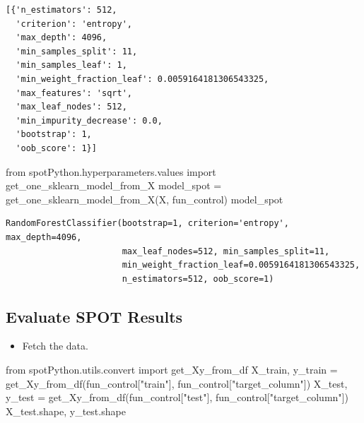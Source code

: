 \documentclass[
  letterpaper,
  DIV=11,
  numbers=noendperiod]{scrreprt}
\newenvironment{Shaded}{\begin{snugshade}}{\end{snugshade}}
\newcommand{\ImportTok}[1]{\textcolor[rgb]{0.00,0.46,0.62}{#1}}
\newcommand{\NormalTok}[1]{\textcolor[rgb]{0.00,0.23,0.31}{#1}}
\newcommand{\OperatorTok}[1]{\textcolor[rgb]{0.37,0.37,0.37}{#1}}
\newcommand{\StringTok}[1]{\textcolor[rgb]{0.13,0.47,0.30}{#1}}
\providecommand{\tightlist}{%
  \setlength{\itemsep}{0pt}\setlength{\parskip}{0pt}}\usepackage{longtable,booktabs,array}
\begin{document}
\begin{verbatim}
[{'n_estimators': 512,
  'criterion': 'entropy',
  'max_depth': 4096,
  'min_samples_split': 11,
  'min_samples_leaf': 1,
  'min_weight_fraction_leaf': 0.0059164181306543325,
  'max_features': 'sqrt',
  'max_leaf_nodes': 512,
  'min_impurity_decrease': 0.0,
  'bootstrap': 1,
  'oob_score': 1}]
\end{verbatim}

\begin{Shaded}
\begin{Highlighting}[]
\ImportTok{from}\NormalTok{ spotPython.hyperparameters.values }\ImportTok{import}\NormalTok{ get\_one\_sklearn\_model\_from\_X}
\NormalTok{model\_spot }\OperatorTok{=}\NormalTok{ get\_one\_sklearn\_model\_from\_X(X, fun\_control)}
\NormalTok{model\_spot}
\end{Highlighting}
\end{Shaded}

\begin{verbatim}
RandomForestClassifier(bootstrap=1, criterion='entropy', max_depth=4096,
                       max_leaf_nodes=512, min_samples_split=11,
                       min_weight_fraction_leaf=0.0059164181306543325,
                       n_estimators=512, oob_score=1)
\end{verbatim}

\hypertarget{evaluate-spot-results}{%
\subsection{Evaluate SPOT Results}\label{evaluate-spot-results}}

\begin{itemize}
\tightlist
\item
  Fetch the data.
\end{itemize}

\begin{Shaded}
\begin{Highlighting}[]
\ImportTok{from}\NormalTok{ spotPython.utils.convert }\ImportTok{import}\NormalTok{ get\_Xy\_from\_df}
\NormalTok{X\_train, y\_train }\OperatorTok{=}\NormalTok{ get\_Xy\_from\_df(fun\_control[}\StringTok{"train"}\NormalTok{], fun\_control[}\StringTok{"target\_column"}\NormalTok{])}
\NormalTok{X\_test, y\_test }\OperatorTok{=}\NormalTok{ get\_Xy\_from\_df(fun\_control[}\StringTok{"test"}\NormalTok{], fun\_control[}\StringTok{"target\_column"}\NormalTok{])}
\NormalTok{X\_test.shape, y\_test.shape}
\end{Highlighting}
\end{Shaded}
\end{document}
